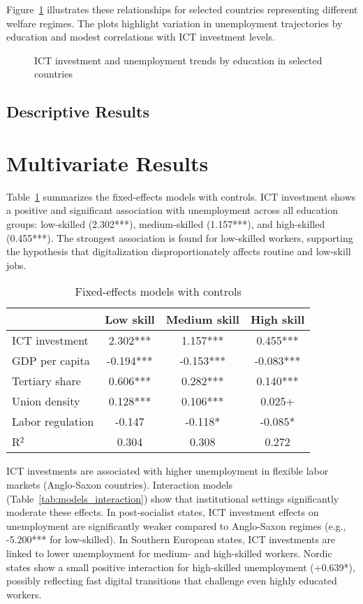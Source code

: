 Figure~\ref{fig:plots} illustrates these relationships for selected countries representing different 
welfare regimes. The plots highlight variation in unemployment trajectories by education and modest 
correlations with ICT investment levels.

\begin{figure}[H]
\centering
\caption{ICT investment and unemployment trends by education in selected countries}
\label{fig:plots}
\end{figure}

\subsection{Descriptive Results}

\section{Multivariate Results}

Table~\ref{tab:models_control} summarizes the fixed-effects models with controls. ICT investment 
shows a positive and significant association with unemployment across all education groups: 
low-skilled (2.302***), medium-skilled (1.157***), and high-skilled (0.455***). The strongest 
association is found for low-skilled workers, supporting the hypothesis that digitalization 
disproportionately affects routine and low-skill jobs.

\begin{table}[H]
\centering
\caption{Fixed-effects models with controls}
\label{tab:models_control}
\begin{tabular}{lccc}
\toprule
 & Low skill & Medium skill & High skill \\
\midrule
ICT investment & 2.302*** & 1.157*** & 0.455*** \\
GDP per capita & -0.194*** & -0.153*** & -0.083*** \\
Tertiary share & 0.606*** & 0.282*** & 0.140*** \\
Union density & 0.128*** & 0.106*** & 0.025+ \\
Labor regulation & -0.147 & -0.118* & -0.085* \\
R$^2$ & 0.304 & 0.308 & 0.272 \\
\bottomrule
\end{tabular}
\end{table}

ICT investments are associated with higher unemployment in flexible labor markets (Anglo-Saxon 
countries). Interaction models (Table~\ref{tab:models_interaction}) show that institutional settings 
significantly moderate these effects. In post-socialist states, ICT investment effects on 
unemployment are significantly weaker compared to Anglo-Saxon regimes (e.g., -5.200*** for 
low-skilled). In Southern European states, ICT investments are linked to lower unemployment for 
medium- and high-skilled workers. Nordic states show a small positive interaction for high-skilled 
unemployment (+0.639*), possibly reflecting fast digital transitions that challenge even highly 
educated workers.

